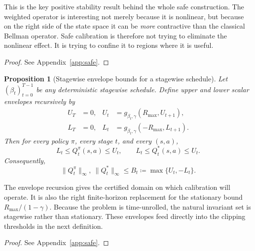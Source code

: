 \documentclass{article}
\newtheorem{proposition}[proposition]{Proposition}
\theoremstyle{remark}
\newcommand{\defeq}{\coloneqq}
\begin{document}
This is the key positive stability result behind the whole safe construction.
The weighted operator is interesting not merely because it is nonlinear, but because on the right side of the state space it can be \emph{more} contractive than the classical Bellman operator.
Safe calibration is therefore not trying to eliminate the nonlinear effect.
It is trying to confine it to regions where it is useful.

\begin{proof}
See Appendix~\ref{app:safe}.
\end{proof}

\begin{proposition}[Stagewise envelope bounds for a stagewise schedule]
\label{prop:stagewise-envelope}
Let $(\beta_t)_{t=0}^{T-1}$ be any deterministic stagewise schedule.
Define upper and lower scalar envelopes recursively by
\begin{align}
U_T &= 0,
&
U_t &= g_{\beta_t,\gamma}(R_{\max},U_{t+1}),
\label{eq:upper-envelope}\\
L_T &= 0,
&
L_t &= g_{\beta_t,\gamma}(-R_{\max},L_{t+1}).
\label{eq:lower-envelope}
\end{align}
Then for every policy $\pi$, every stage $t$, and every $(s,a)$,
\begin{equation}
L_t \le Q_t^\pi(s,a) \le U_t,
\qquad
L_t \le Q_t^*(s,a) \le U_t.
\label{eq:raw-envelope-bound}
\end{equation}
Consequently,
\begin{equation}
\|Q_t^\pi\|_\infty,\ \|Q_t^*\|_\infty \le B_t \defeq \max\{U_t,-L_t\}.
\label{eq:fp-bound}
\end{equation}
\end{proposition}

The envelope recursion gives the certified domain on which calibration will operate.
It is also the right finite-horizon replacement for the stationary bound $R_{\max}/(1-\gamma)$.
Because the problem is time-unrolled, the natural invariant set is stagewise rather than stationary.
These envelopes feed directly into the clipping thresholds in the next definition.

\begin{proof}
See Appendix~\ref{app:safe}.
\end{proof}
\end{document}
